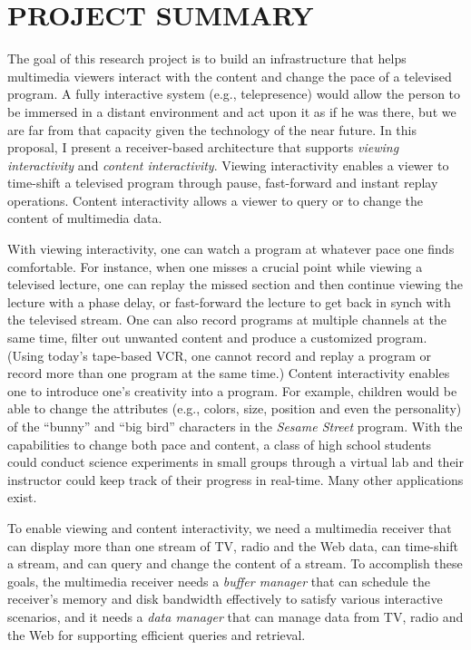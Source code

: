 \section*{PROJECT SUMMARY}

The goal of this research project is to build an infrastructure
that helps multimedia viewers interact with the content and 
change the pace of a televised program.
A fully interactive system (e.g., telepresence) would allow
the person to be immersed in a distant environment
and act upon it as if he was there, but we are far from
that capacity given the technology of the near future.
In this proposal, I present a receiver-based
architecture that supports {\em viewing interactivity}
and {\em content interactivity}. Viewing interactivity enables
a viewer to time-shift a televised program through
pause, fast-forward and instant replay operations. 
Content interactivity allows a viewer to query or to
change the content of multimedia data. 

With viewing interactivity, one can watch a program at 
whatever pace one finds comfortable. For instance, 
when one misses a crucial point while viewing a televised
lecture, one can replay the missed section and then 
continue viewing the lecture with a phase delay, or fast-forward
the lecture to get back in synch with the televised stream.
One can also record programs at multiple channels at the same
time, filter out unwanted
content and produce a customized program. 
(Using today's tape-based VCR, one cannot record
and replay a program or record more than one program 
at the same time.)
Content interactivity enables one to introduce one's 
creativity into a program.
For example, children would be able to change the attributes 
(e.g., colors, size, position and even the personality)
of the ``bunny'' and ``big bird'' 
characters in the {\it Sesame Street} program.  
With the capabilities to change both pace and content,
a class of high school students could conduct science experiments
in small groups through a virtual lab and their instructor
could keep track of their progress in real-time.   
Many other applications exist.

To enable viewing and content interactivity, 
we need a multimedia receiver that can display
more than one stream of TV, radio and the Web data,
can time-shift a stream, and can query and change
the content of a stream.  To accomplish these
goals, the multimedia receiver
needs a {\em buffer manager} that can schedule the
receiver's memory and 
disk bandwidth effectively to satisfy 
various interactive scenarios, and it needs a {\em data manager}
that can manage data from TV, radio and the Web 
for supporting efficient queries and retrieval.

